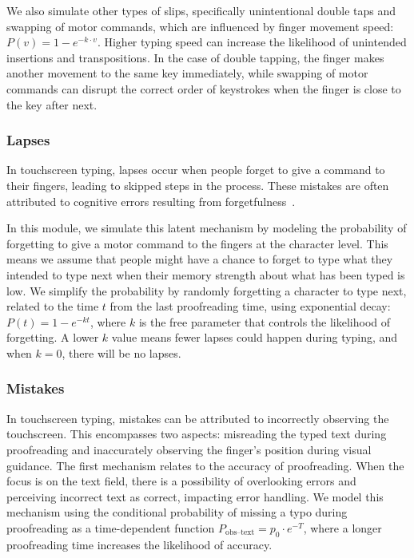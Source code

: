 We also simulate other types of slips, specifically  unintentional double taps and swapping of motor commands, which are influenced by finger movement speed: $P(v)=1 - e^{-k \cdot v}$. Higher typing speed can increase the likelihood of unintended insertions and transpositions.
In the case of double tapping, the finger makes another movement to the same key immediately, while swapping of motor commands can disrupt the correct order of keystrokes when the finger is close to the key after next.

\subsubsection{Lapses}

In touchscreen typing, lapses occur when people forget to give a command to their fingers, leading to skipped steps in the process. These mistakes are often attributed to cognitive errors resulting from forgetfulness~\cite{nicolau2012elderly}.

In this module, we simulate this latent mechanism by modeling the probability of forgetting to give a motor command to the fingers at the character level. This means we assume that people might have a chance to forget to type what they intended to type next when their memory strength about what has been typed is low.
We simplify the probability by randomly forgetting a character to type next, related to the time $t$ from the last proofreading time, using exponential decay: $P(t) = 1 - e^{-kt}$, where $k$ is the free parameter that controls the likelihood of forgetting. A lower $k$ value means fewer lapses could happen during typing, and when $k = 0$, there will be no lapses.


\subsubsection{Mistakes}

In touchscreen typing, mistakes can be attributed to incorrectly observing the touchscreen. This encompasses two aspects: misreading the typed text during proofreading and inaccurately observing the finger's position during visual guidance.
The first mechanism relates to the accuracy of proofreading. When the focus is on the text field, there is a possibility of overlooking errors and perceiving incorrect text as correct, impacting error handling. We model this mechanism using the conditional probability of missing a typo during proofreading as a time-dependent function $P_{\text {obs--text}}= p_0 \cdot e^{-T}$, where a longer proofreading time increases the likelihood of accuracy.

